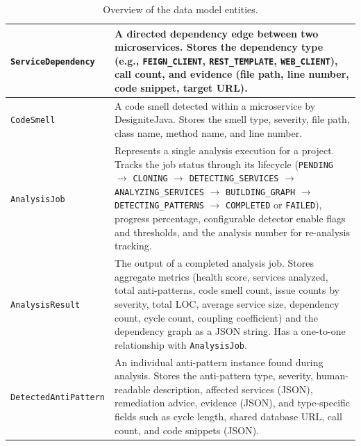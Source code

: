 \begin{table}[htbp]
\begin{tabular}{|l|p{9cm}|}
        \hline
        \texttt{ServiceDependency}   & A directed dependency edge between two microservices. Stores the dependency type (e.g., \texttt{FEIGN\_CLIENT}, \texttt{REST\_TEMPLATE}, \texttt{WEB\_CLIENT}), call count, and evidence (file path, line number, code snippet, target URL).                                                                                                                                                                                  \\
        \hline
        \texttt{CodeSmell}           & A code smell detected within a microservice by DesigniteJava. Stores the smell type, severity, file path, class name, method name, and line number.                                                                                                                                                                                                                                                                           \\
        \hline
        \texttt{AnalysisJob}         & Represents a single analysis execution for a project. Tracks the job status through its lifecycle (\texttt{PENDING} $\to$ \texttt{CLONING} $\to$ \texttt{DETECTING\_SERVICES} $\to$ \texttt{ANALYZING\_SERVICES} $\to$ \texttt{BUILDING\_GRAPH} $\to$ \texttt{DETECTING\_PATTERNS} $\to$ \texttt{COMPLETED} or \texttt{FAILED}), progress percentage, configurable detector enable flags and thresholds, and the analysis number for re-analysis tracking. \\
        \hline
        \texttt{AnalysisResult}      & The output of a completed analysis job. Stores aggregate metrics (health score, services analyzed, total anti-patterns, code smell count, issue counts by severity, total LOC, average service size, dependency count, cycle count, coupling coefficient) and the dependency graph as a JSON string. Has a one-to-one relationship with \texttt{AnalysisJob}.                                                                 \\
        \hline
        \texttt{DetectedAntiPattern} & An individual anti-pattern instance found during analysis. Stores the anti-pattern type, severity, human-readable description, affected services (JSON), remediation advice, evidence (JSON), and type-specific fields such as cycle length, shared database URL, call count, and code snippets (JSON).                                                                                                                       \\
        \hline
    \end{tabular}
    \caption{Overview of the data model entities.}
    \label{tab:entities}
\end{table}

